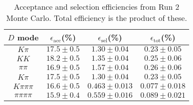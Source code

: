 \begin{table}[H]
    \centering
    \begin{tabular}{cccc}
        \toprule
        $D$ mode & $\epsilon_\mathrm{acc}$(\%) &  $\epsilon_\mathrm{sel}$(\%) &  $\epsilon_\mathrm{tot}$(\%) \\
        \midrule
        $K\pi$ & $17.5 \pm 0.5$ & $1.30 \pm 0.04$ & $0.23 \pm 0.05$ \\
        $KK$ & $18.2 \pm 0.5$ & $1.35 \pm 0.04$ & $0.25 \pm 0.06$ \\
        $\pi\pi$ & $16.9 \pm 0.5$ & $1.57 \pm 0.04$ & $0.26 \pm 0.06$ \\
        $K\pi$ & $17.5 \pm 0.5$ & $1.30 \pm 0.04$ & $0.23 \pm 0.05$ \\
        $K\pi\pi\pi$ & $16.6 \pm 0.5$ & $0.463 \pm 0.013$ & $0.077 \pm 0.018$ \\
        $\pi\pi\pi\pi$ & $15.9 \pm 0.4$ & $0.559 \pm 0.016$ & $0.089 \pm 0.021$ \\
        \bottomrule
    \end{tabular}
    \caption{Acceptance and selection efficiencies from  Run 2 Monte Carlo. Total efficiency is the  product of these.}
\label{tab:selection_efficiency_run2}
\end{table}
